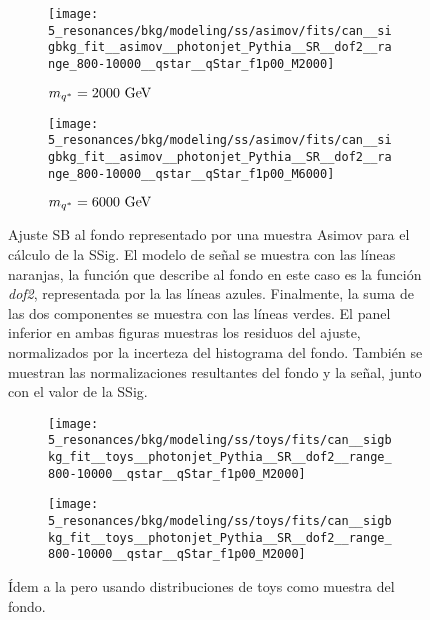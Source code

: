 \begin{figure}[ht!]
    \centering
    \begin{subfigure}[h]{0.49\linewidth}
        \centering
        \texttt{[image: 5\_resonances/bkg/modeling/ss/asimov/fits/can\_\_sigbkg\_fit\_\_asimov\_\_photonjet\_Pythia\_\_SR\_\_dof2\_\_range\_800-10000\_\_qstar\_\_qStar\_f1p00\_M2000]}
        \caption{\(m_{q^*} = 2000~\text{GeV}\)}
    \end{subfigure}
    \hfill
    \begin{subfigure}[h]{0.49\linewidth}
        \centering
        \texttt{[image: 5\_resonances/bkg/modeling/ss/asimov/fits/can\_\_sigbkg\_fit\_\_asimov\_\_photonjet\_Pythia\_\_SR\_\_dof2\_\_range\_800-10000\_\_qstar\_\_qStar\_f1p00\_M6000]}
        \caption{\(m_{q^*} = 6000~\text{GeV}\)}
    \end{subfigure}
    \caption{Ajuste \ac{SB} al fondo representado por una muestra Asimov para el cálculo de la \ac{SSig}. El modelo de señal se muestra con las líneas naranjas, la función que describe al fondo en este caso es la función \textit{dof2}, representada por la las líneas azules. Finalmente, la suma de las dos componentes se muestra con las líneas verdes. El panel inferior en ambas figuras muestras los residuos del ajuste, normalizados por la incerteza del histograma del fondo. También se muestran las normalizaciones resultantes del fondo y la señal, junto con el valor de la \ac{SSig}.}
    \label{fig:bkg:modeling:sigbkg:sstest:sstest_asimov_examples}
\end{figure}

\begin{figure}[ht!]
    \centering
    \begin{subfigure}[h]{0.49\linewidth}
        \centering
        \texttt{[image: 5\_resonances/bkg/modeling/ss/toys/fits/can\_\_sigbkg\_fit\_\_toys\_\_photonjet\_Pythia\_\_SR\_\_dof2\_\_range\_800-10000\_\_qstar\_\_qStar\_f1p00\_M2000]}
    \end{subfigure}
    \hfill
    \begin{subfigure}[h]{0.49\linewidth}
        \centering
        \texttt{[image: 5\_resonances/bkg/modeling/ss/toys/fits/can\_\_sigbkg\_fit\_\_toys\_\_photonjet\_Pythia\_\_SR\_\_dof2\_\_range\_800-10000\_\_qstar\_\_qStar\_f1p00\_M2000]}
    \end{subfigure}
    \caption{Ídem a la \Fig{\ref{fig:bkg:modeling:sigbkg:sstest:sstest_asimov_examples}} pero usando distribuciones de toys como muestra del fondo.}
    \label{fig:bkg:modeling:sigbkg:sstest:sstest_toys_examples}
\end{figure}

